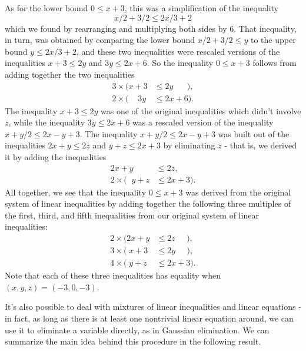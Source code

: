 As for the lower bound $0 \le x + 3$, this was a simplification of the inequality
\[
x/2 + 3/2 \le 2x/3 + 2
\]
which we found by rearranging and multiplying both sides by $6$. That inequality, in turn, was obtained by comparing the lower bound $x/2 + 3/2 \le y$ to the upper bound $y \le 2x/3 + 2$, and these two inequalities were rescaled versions of the inequalities $x + 3 \le 2y$ and $3y \le 2x + 6$. So the inequality $0 \le x + 3$ follows from adding together the two inequalities
\begin{align*}
3 \times \Big(x + 3 &\le 2y\;\;\;\;\;\;\Big),\\
2 \times \Big(\;\;\;\;3y &\le 2x + 6\Big).
\end{align*}
The inequality $x+3 \le 2y$ was one of the original inequalities which didn't involve $z$, while the inequality $3y \le 2x + 6$ was a rescaled version of the inequality $x + y/2 \le 2x - y + 3$. The inequality $x + y/2 \le 2x - y + 3$ was built out of the inequalities $2x + y \le 2z$ and $y + z \le 2x + 3$ by eliminating $z$ - that is, we derived it by adding the inequalities
\begin{align*}
2x + y &\le 2z,\\
2\times\Big(\;\;y + z &\le 2x + 3\Big).
\end{align*}
All together, we see that the inequality $0 \le x + 3$ was derived from the original system of linear inequalities by adding together the following three multiples of the first, third, and fifth inequalities from our original system of linear inequalities:
\begin{align*}
2 \times \Big(2x + y &\le 2z\;\;\;\;\;\Big),\\
3 \times \Big(\;x + 3 &\le 2y\;\;\;\;\;\Big),\\
4\times\Big(\;y + z &\le 2x + 3\Big).
\end{align*}
Note that each of these three inequalities has equality when $(x,y,z) = (-3,0,-3)$.

It's also possible to deal with mixtures of linear inequalities and linear equations - in fact, as long as there is at least one nontrivial linear equation around, we can use it to eliminate a variable directly, as in Gaussian elimination. We can summarize the main idea behind this procedure in the following result.


